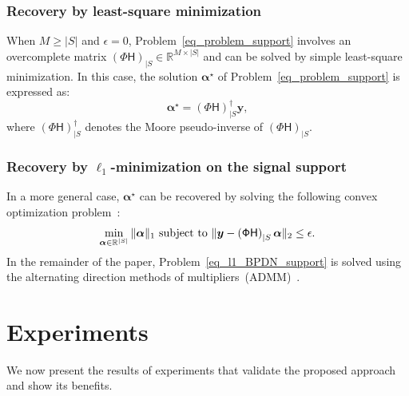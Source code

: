 \documentclass{article}
\newcommand{\vect}[1]{\bm{#1}}
\newcommand{\mat}[1]{\mathsf{#1}}
\theoremstyle{definition}
\begin{document}
\subsubsection{Recovery by least-square minimization}
\label{subsec_ls_recovery}
When $M \geq |S|$ and $\epsilon=0$, Problem~\eqref{eq_problem_support} involves an overcomplete matrix $\left(\mat{\Phi H}\right)_{|S} \in \mathbb{R}^{M \times |S|}$ and can be solved by simple least-square minimization. 
In this case, the solution $\vect{\alpha}^\star$ of Problem~\eqref{eq_problem_support} is expressed as:
\begin{equation}
\label{eq_solution_LS}
	\vect{\alpha}^\star = \left(\mat{\Phi H}\right)_{|S}^\dagger  \vect{y},
\end{equation}
where $\left(\mat{\Phi H}\right)_{|S}^\dagger$ denotes the Moore pseudo-inverse of $\left(\mat{\Phi H}\right)_{|S}$.
\subsubsection{Recovery by $\ell_1$-minimization on the signal support}
\label{subsec_ls_recovery}
In a more general case, $\vect{\alpha}^\star$ can be recovered by solving the following convex optimization problem~\cite{candes11}:
\begin{equation}
\label{eq_l1_BPDN_support}
\min_{\vect{\alpha} \in \mathbb{R}^{|S|}}\|\vect{\alpha}\|_{1}
\textnormal{ subject to }\| \bm{y}-\left(\mat{\Phi H}\right)_{|S}\vect{\alpha}\|_{2}\leq\epsilon.
\end{equation}
In the remainder of the paper, Problem~\eqref{eq_l1_BPDN_support} is solved using the alternating direction methods of multipliers~(ADMM)~\cite{Boyd2010}.

\section{Experiments}
\label{sec_exp}
We now present the results of experiments that validate the proposed approach and show its benefits.
\end{document}
